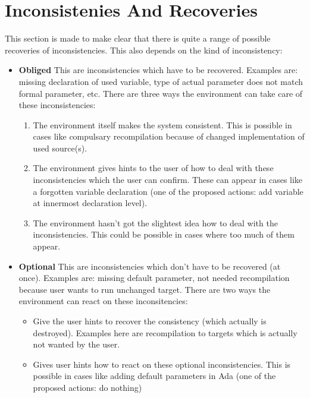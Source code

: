 \section{Inconsistenies And Recoveries}
This section is made to make clear that there is quite a range of possible 
recoveries of inconsistencies. This also depends on the kind of inconsistency:
\begin{itemize}
  \item {\bf Obliged} This are inconsistencies which have to be recovered. 
        Examples are: missing declaration of used variable, type of actual 
        parameter does not match formal parameter, etc. There are three ways 
        the environment can take care of these inconsistencies:
    \begin{enumerate}
      \item The environment itself makes the system consistent. This is 
            possible in cases like compulsary recompilation because of changed 
            implementation of used source(s).
      \item The environment gives hints to the user of how to deal with these
            inconsistencies which the user can confirm. These can appear in 
            cases like a forgotten variable declaration (one of the proposed 
            actions: add variable at innermost declaration level).
      \item The environment hasn't got the slightest idea how to deal with the
            inconsistencies. This could be possible in cases where too much 
            of them appear.
    \end{enumerate}
  \item {\bf Optional} This are inconsistencies which don't have to be 
        recovered (at once). Examples are: missing default parameter, not 
        needed recompilation because user wants to run unchanged target. There
        are two ways the environment can react on these inconsitencies:
    \begin{itemize}
      \item Give the user hints to recover the consistency (which actually is
            destroyed). Examples here are recompilation to targets which is 
            actually not wanted by the user. 
      \item Gives user hints how to react on these optional inconsistencies.
            This is possible in cases like adding default parameters in Ada 
            (one of the proposed actions: do nothing)
    \end{itemize}
\end{itemize}
